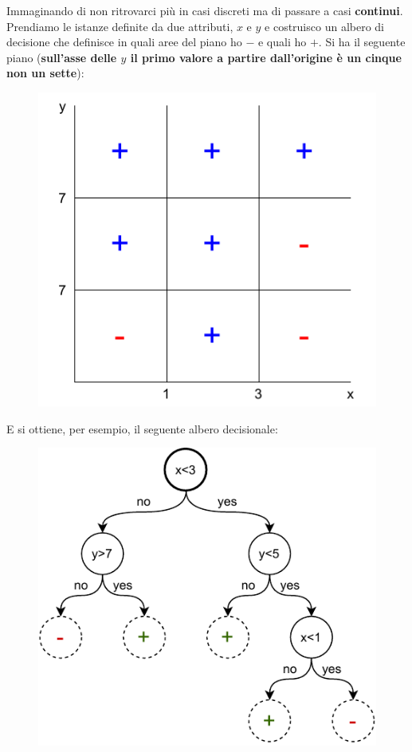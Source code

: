 \begin{esempio}
  Immaginando  di non ritrovarci più in casi discreti ma di passare a casi \textbf{continui}. Prendiamo le istanze definite da due attributi, $x$ e $y$ e costruisco un
  albero di decisione che definisce in quali aree del piano ho $-$ e quali ho
  $+$.
  \newpage
  Si ha il seguente piano (\textbf{sull'asse delle $y$ il primo valore a partire
  dall'origine è un cinque non un sette}): 
  \begin{figure}[H]
    \centering
     \includegraphics[scale = 0.8]{img/dt3.pdf}
  \end{figure}
  E si ottiene, per esempio, il seguente albero decisionale:
  \begin{figure}[H]
    \centering
    \includegraphics[scale = 0.9]{img/dt4.pdf}

\end{figure}
\end{esempio}
